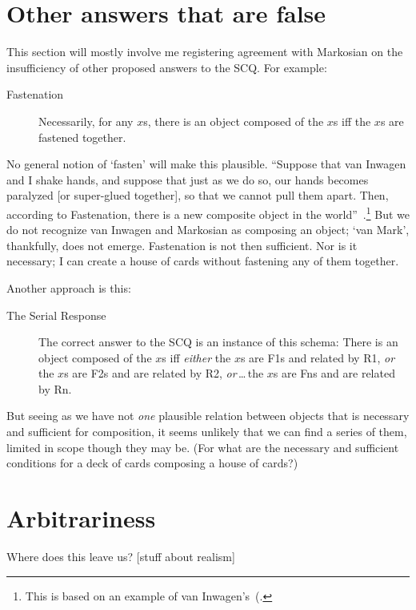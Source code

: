\documentclass[11pt]{article}
\begin{document}
\begin{spacing}{1.5}
\section{Other answers that are false}
This section will mostly involve me registering agreement with Markosian on the insufficiency of other proposed answers to the SCQ. For example:
\begin{description}
	\item[Fastenation] Necessarily, for any $x$s, there is an object composed of the $x$s iff the $x$s are fastened together.~\citep[223]{markosian1998a}
\end{description}
No general notion of `fasten' will make this plausible. ``Suppose that van Inwagen and I shake hands, and suppose that just as we do so, our hands becomes paralyzed [or super-glued together], so that we cannot pull them apart. Then, according to Fastenation, there is a new composite object in the world''~\citep[224]{markosian1998a}.\footnote{This is based on an example of van Inwagen's~(\citeyear[57--58]{inwagen1995}.} But we do not recognize van Inwagen and Markosian as composing an object; `van Mark', thankfully, does not emerge. Fastenation is not then sufficient. Nor is it necessary; I can create a house of cards without fastening any of them together.

Another approach is this:
\begin{description}
	\item[The Serial Response] The correct answer to the SCQ is an instance of this schema: There is an object composed of the $x$s iff {\em either} the $x$s are F1s and related by R1, {\em or} the $x$s are F2s and are related by R2, {\em or}\,\ldots\,the $x$s are Fns and are related by Rn.~\citep[230]{markosian1998a}
\end{description}
But seeing as we have not {\em one} plausible relation between objects that is necessary and sufficient for composition, it seems unlikely that we can find a series of them, limited in scope though they may be. (For what are the necessary and sufficient conditions for a deck of cards composing a house of cards?)

\section{Arbitrariness}
Where does this leave us? [stuff about realism]

\ifstandalone
\end{spacing}%
\fi
\end{document}
